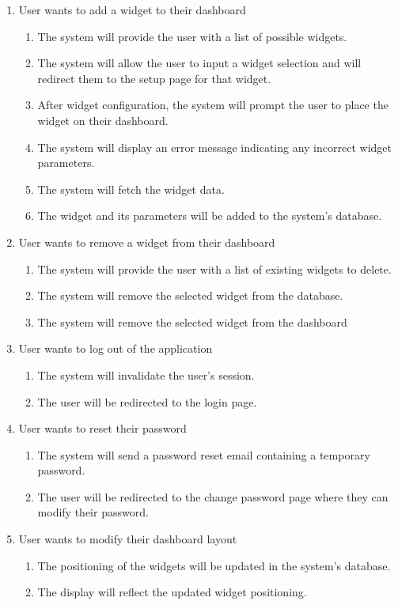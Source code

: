 \documentclass[]{article}
\begin{document}
\begin{enumerate}[{VP}1]
\begin{enumerate}[{BE}1]
\begin{enumerate}
			\end{enumerate}
			\item User wants to add a widget to their dashboard
			\begin{enumerate}
				\item The system will provide the user with a list of possible widgets. 
				\item The system will allow the user to input a widget selection and will redirect them to the setup page for that widget.
				\item After widget configuration, the system will prompt the user to place the widget on their dashboard.
				\item The system will display an error message indicating any incorrect widget parameters.
				\item The system will fetch the widget data.
				\item The widget and its parameters will be added to the system's database.
			\end{enumerate}
			\item User wants to remove a widget from their dashboard
			\begin{enumerate}
				\item The system will provide the user with a list of existing widgets to delete. 
				\item The system will remove the selected widget from the database.
				\item The system will remove the selected widget from the dashboard
			\end{enumerate}
			\item User wants to log out of the application
			\begin{enumerate}
				\item The system will invalidate the user's session.
				\item The user will be redirected to the login page.
			\end{enumerate}
			\item User wants to reset their password
			\begin{enumerate}
				\item The system will send a password reset email containing a temporary password.
				\item The user will be redirected to the change password page where they can modify their password.
			\end{enumerate}
			\item User wants to modify their dashboard layout
			\begin{enumerate}
				\item The positioning of the widgets will be updated in the system's database.
				\item The display will reflect the updated widget positioning.
			\end{enumerate}
		\end{enumerate}
	\end{enumerate}
	
\end{document}
